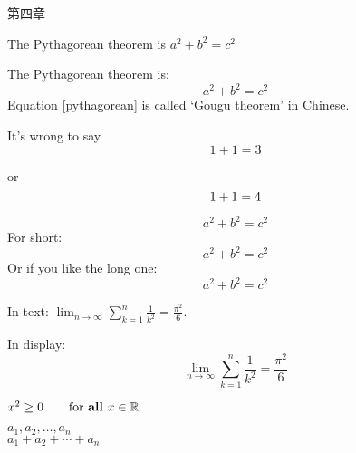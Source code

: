 \documentclass[]{ctexart}
\title{}
\author{}
\begin{document}
	\section{}

	第四章

	The Pythagorean theorem is
	$a^2 + b^2 = c^2$

	\iffalse
	单独成行的行间公式在 LATEX 里由 equation 环境包裹。equation 环境为公式自动生成一
	个编号，这个编号可以用 \label 和 \ref 生成交叉引用，amsmath 的 \eqref 命令甚至为引用
	自动加上圆括号；还可以用 \tag 命令手动修改公式的编号，或者用 \notag 命令取消为公式编
	号（与之基本等效的命令是 \nonumber）
	\fi

	The Pythagorean theorem is:
	\begin{equation}
		a^2 + b^2 = c^2 \label{pythagorean}
	\end{equation}
	Equation \eqref{pythagorean} is
	called `Gougu theorem' in Chinese.


	It's wrong to say
	\begin{equation}
		1 + 1 = 3 \tag{dumb}
	\end{equation}

	or
	\begin{equation}
		1 + 1 = 4 \notag
	\end{equation}

	\begin{equation*}
		a^2 + b^2 = c^2
	\end{equation*}
	For short:
	\[a^2 + b^2 = c^2 \]
	Or if you like the long one:
	\begin{displaymath}
		a^2 + b^2 = c^2
	\end{displaymath}


	In text:
	$\lim_{n \to \infty}
	\sum_{k=1}^n \frac{1}{k^2}
	= \frac{\pi^2}{6}$.


	In display:
	\[
		\lim_{n \to \infty}
		\sum_{k=1}^n \frac{1}{k^2}
		= \frac{\pi^2}{6}
	\]


	$x^{2} \geq 0 \qquad
	\text{for \textbf{all} }
	x\in\mathbb{R}$


	$a_1, a_2, \dots, a_n$ \\
	$a_1 + a_2 + \cdots + a_n$
\end{document}

